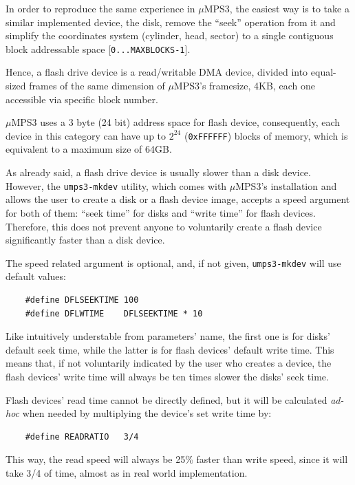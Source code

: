 \documentclass[12pt,a4paper,openright,twoside]{report}
\begin{document}
In order to reproduce the same experience in $\mu$MPS3, the easiest way is to take a similar implemented device, the disk, remove the ``seek'' operation from it and simplify the coordinates system (cylinder, head, sector) to a single contiguous block addressable space [\texttt{0...MAXBLOCKS-1}].

Hence, a flash drive device is a read/writable DMA device, divided into equal-sized frames of the same dimension of $\mu$MPS3's framesize, 4KB, each one accessible via specific block number.

$\mu$MPS3 uses a 3 byte (24 bit) address space for flash device, consequently, each device in this category can have up to $2^{24}$ (\texttt{0xFFFFFF}) blocks of memory, which is equivalent to a maximum size of 64GB.

As already said, a flash drive device is usually slower than a disk device.
However, the \texttt{umps3-mkdev} utility, which comes with $\mu$MPS3's installation and allows the user to create a disk or a flash device image, accepts a speed argument for both of them: ``seek time'' for disks and ``write time'' for flash devices. Therefore, this does not prevent anyone to voluntarily create a flash device significantly faster than a disk device.

The speed related argument is optional, and, if not given, \texttt{umps3-mkdev} will use default values:
\begin{verbatim}
	#define DFLSEEKTIME 100
	#define DFLWTIME    DFLSEEKTIME * 10
	\end{verbatim}
Like intuitively understable from parameters' name, the first one is for disks' default seek time, while the latter is for flash devices' default write time. This means that, if not voluntarily indicated by the user who creates a device, the flash devices' write time will always be ten times slower the disks' seek time.

Flash devices' read time cannot be directly defined, but it will be calculated \textit{ad-hoc} when needed by multiplying the device's set write time by:
\begin{verbatim}
	#define READRATIO   3/4
	\end{verbatim}
This way, the read speed will always be 25\% faster than write speed, since it will take 3/4 of time, almost as in real world implementation.
\end{document}

